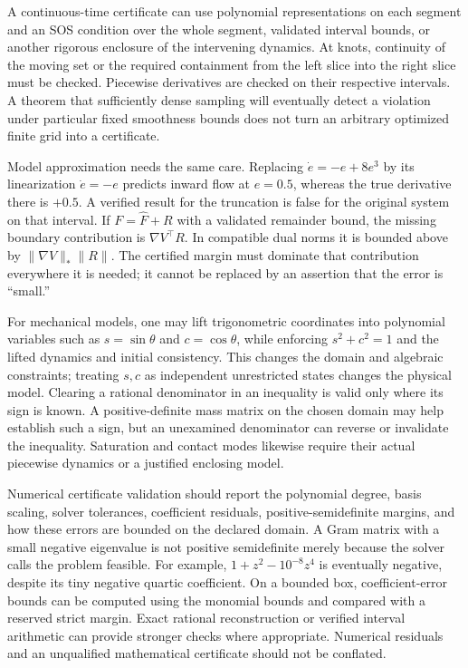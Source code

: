 \documentclass[12pt, openany]{book}
\theoremstyle{plain}
\begin{document}
A continuous-time certificate can use polynomial representations on each segment and an SOS condition over the whole segment, validated interval bounds, or another rigorous enclosure of the intervening dynamics. At knots, continuity of the moving set or the required containment from the left slice into the right slice must be checked. Piecewise derivatives are checked on their respective intervals. A theorem that sufficiently dense sampling will eventually detect a violation under particular fixed smoothness bounds does not turn an arbitrary optimized finite grid into a certificate.

Model approximation needs the same care. Replacing $\dot e=-e+8e^3$ by its linearization $\dot e=-e$ predicts inward flow at $e=0.5$, whereas the true derivative there is $+0.5$. A verified result for the truncation is false for the original system on that interval. If $F=\widehat F+R$ with a validated remainder bound, the missing boundary contribution is $\nabla V^\top R$. In compatible dual norms it is bounded above by $\|\nabla V\|_*\|R\|$. The certified margin must dominate that contribution everywhere it is needed; it cannot be replaced by an assertion that the error is ``small.''

For mechanical models, one may lift trigonometric coordinates into polynomial variables such as $s=\sin\theta$ and $c=\cos\theta$, while enforcing $s^2+c^2=1$ and the lifted dynamics and initial consistency. This changes the domain and algebraic constraints; treating $s,c$ as independent unrestricted states changes the physical model. Clearing a rational denominator in an inequality is valid only where its sign is known. A positive-definite mass matrix on the chosen domain may help establish such a sign, but an unexamined denominator can reverse or invalidate the inequality. Saturation and contact modes likewise require their actual piecewise dynamics or a justified enclosing model.

Numerical certificate validation should report the polynomial degree, basis scaling, solver tolerances, coefficient residuals, positive-semidefinite margins, and how these errors are bounded on the declared domain. A Gram matrix with a small negative eigenvalue is not positive semidefinite merely because the solver calls the problem feasible. For example, $1+z^2-10^{-8}z^4$ is eventually negative, despite its tiny negative quartic coefficient. On a bounded box, coefficient-error bounds can be computed using the monomial bounds and compared with a reserved strict margin. Exact rational reconstruction or verified interval arithmetic can provide stronger checks where appropriate. Numerical residuals and an unqualified mathematical certificate should not be conflated.
\end{document}
